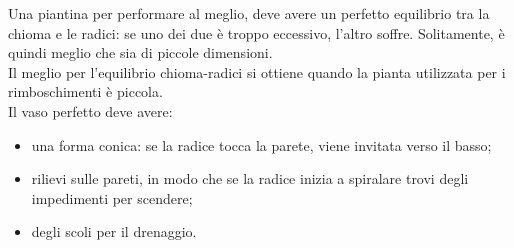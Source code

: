 Una piantina per performare al meglio, deve avere un perfetto equilibrio tra la chioma e le radici: se uno dei due è troppo eccessivo, l'altro soffre. Solitamente, è quindi meglio che sia di piccole dimensioni.\\
Il meglio per l'equilibrio chioma-radici si ottiene quando la pianta utilizzata per i rimboschimenti è piccola.\\
Il vaso perfetto deve avere:
\begin{itemize}[nosep]
    \item una forma conica: se la radice tocca la parete, viene invitata verso il basso;
    \item rilievi sulle pareti, in modo che se la radice inizia a spiralare trovi degli impedimenti per scendere;
    \item degli scoli per il drenaggio.
\end{itemize}